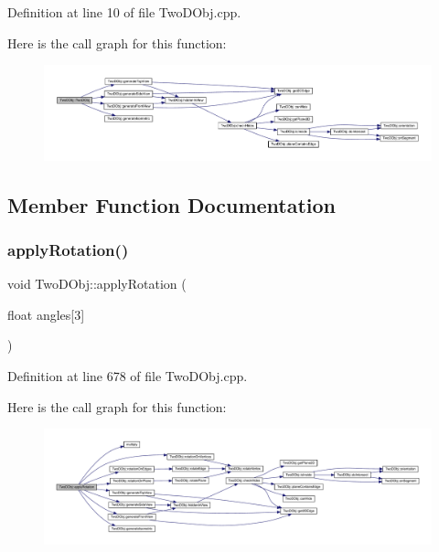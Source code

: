 Definition at line 10 of file Two\+D\+Obj.\+cpp.

Here is the call graph for this function\+:
\nopagebreak
\begin{figure}[H]
\begin{center}
\leavevmode
\includegraphics[width=350pt]{class_two_d_obj_aa3c92bdec23c2c687b3e238934e24590_cgraph}
\end{center}
\end{figure}


\subsection{Member Function Documentation}
\mbox{\label{class_two_d_obj_a4d364edb11e97ddaf8eb9c61666eb486}} 
\subsubsection{\texorpdfstring{apply\+Rotation()}{applyRotation()}}
{\footnotesize\ttfamily void Two\+D\+Obj\+::apply\+Rotation (\begin{DoxyParamCaption}\item[{float}]{angles\mbox{[}3\mbox{]} }\end{DoxyParamCaption})}



Definition at line 678 of file Two\+D\+Obj.\+cpp.

Here is the call graph for this function\+:
\nopagebreak
\begin{figure}[H]
\begin{center}
\leavevmode
\includegraphics[width=350pt]{class_two_d_obj_a4d364edb11e97ddaf8eb9c61666eb486_cgraph}
\end{center}
\end{figure}
\mbox{\label{class_two_d_obj_afddeaea49f6d8bc76473a9fa48ff37ef}} 
